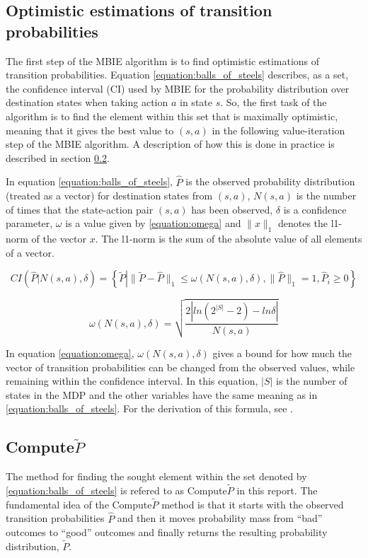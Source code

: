 
\subsection{Optimistic estimations of transition probabilities}
\label{sec:computep}

The first step of the MBIE algorithm is to find optimistic estimations of transition probabilities. Equation \eqref{equation:balls_of_steels} describes, as a set, the confidence interval (CI) used by MBIE for the probability distribution over destination states when taking action $a$ in state $s$. So, the first task of the algorithm is to find the element within this set that is maximally optimistic, meaning that it gives the best value to $(s,a)$ in the following value-iteration step of the MBIE algorithm. A description of how this is done in practice is described in section \ref{sec:ptilde}. 

In equation \eqref{equation:balls_of_steels}, $\hat{P}$ is the observed probability distribution (treated as a vector) for destination states from $(s,a)$, $N(s,a)$ is the number of times that the state-action pair $(s,a)$ has been observed, $\delta$ is a confidence parameter,  $\omega$ is a value given by \eqref{equation:omega} and $\|x\|_1$ denotes the l1-norm of the vector $x$. The l1-norm is the sum of the absolute value of all elements of a vector. 

\begin{equation}
\label{equation:balls_of_steels}
CI\left(\hat{P} \left| N(s, a), \delta\right.\right)  = \left\{\tilde{P} \left| \|\tilde{P} - \hat{P}\|_1 \le \omega(N(s,a), \delta), \|\hat{P}\|_1 = 1, \hat{P}_i \geq 0  \right.\right\}
\end{equation}

\begin{equation}
\label{equation:omega}
   \omega(N(s,a),\delta) = {\sqrt{\frac{2|ln(2^{|S|}-2) - ln  \delta |}{N(s,a)}}}
\end{equation}

In equation \eqref{equation:omega}, $\omega(N(s,a),\delta)$ gives a bound for how much the vector of transition probabilities can be changed from the observed values, while remaining within the confidence interval. In this equation, $|S|$ is the number of states in the MDP and the other variables have the same meaning as in \eqref{equation:balls_of_steels}. For the derivation of this formula, see  \textcite{Strehl20081309}.

\subsection{Compute$\tilde{P}$}
\label{sec:ptilde}
The method for finding the sought element within the set denoted by \eqref{equation:balls_of_steels} 
is refered to as Compute$\tilde{P}$ in this report. 
The fundamental idea of the Compute$\tilde{P}$ method is that it starts with
the observed transition probabilities $\hat{P}$ and then it moves probability
mass from ``bad'' outcomes to ``good'' outcomes and finally returns the resulting probability distribution, $\tilde{P}$. 


